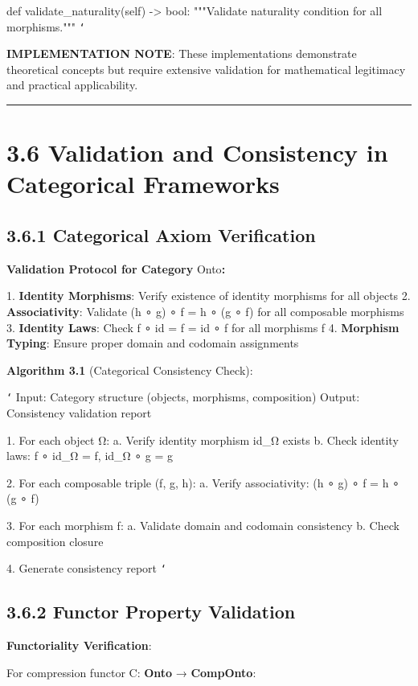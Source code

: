     def validate_naturality(self) -> bool:
        """Validate naturality condition for all morphisms."""
\texttt{`}

\textbf{IMPLEMENTATION NOTE}: These implementations demonstrate theoretical concepts but require extensive validation for mathematical legitimacy and practical applicability.

\hrule

\section{3.6 Validation and Consistency in Categorical Frameworks}

\subsection{3.6.1 Categorical Axiom Verification}

\textbf{Validation Protocol for Category }Onto\textbf{:}

1. \textbf{Identity Morphisms}: Verify existence of identity morphisms for all objects
2. \textbf{Associativity}: Validate (h ∘ g) ∘ f = h ∘ (g ∘ f) for all composable morphisms
3. \textbf{Identity Laws}: Check f ∘ id = f = id ∘ f for all morphisms f
4. \textbf{Morphism Typing}: Ensure proper domain and codomain assignments

\textbf{Algorithm 3.1} (Categorical Consistency Check):

\texttt{`}
Input: Category structure (objects, morphisms, composition)
Output: Consistency validation report

1. For each object Ω:
   a. Verify identity morphism id_Ω exists
   b. Check identity laws: f ∘ id_Ω = f, id_Ω ∘ g = g
   
2. For each composable triple (f, g, h):
   a. Verify associativity: (h ∘ g) ∘ f = h ∘ (g ∘ f)
   
3. For each morphism f:
   a. Validate domain and codomain consistency
   b. Check composition closure
   
4. Generate consistency report
\texttt{`}

\subsection{3.6.2 Functor Property Validation}

\textbf{Functoriality Verification}:

For compression functor C: \textbf{Onto} → \textbf{CompOnto}:

